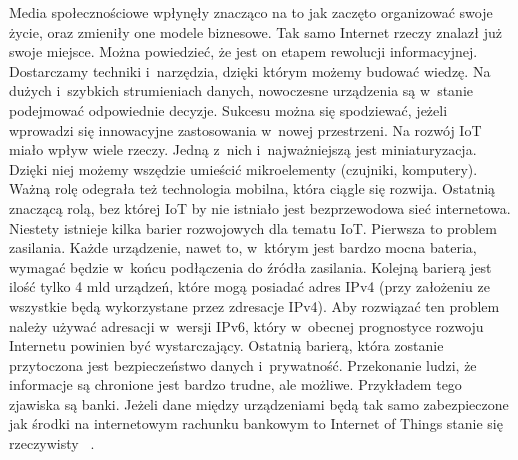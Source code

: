 \documentclass{xmgr}
\begin{document}
	Media społecznościowe wpłynęły znacząco na to jak zaczęto organizować swoje życie, oraz zmieniły one modele biznesowe. Tak samo Internet rzeczy znalazł już swoje miejsce. Można powiedzieć, że jest on etapem rewolucji informacyjnej. Dostarczamy techniki i~narzędzia, dzięki którym możemy budować wiedzę. Na dużych i~szybkich strumieniach danych, nowoczesne urządzenia są w~stanie podejmować odpowiednie decyzje. Sukcesu można się spodziewać, jeżeli wprowadzi się innowacyjne zastosowania w~nowej przestrzeni. 
	Na rozwój IoT miało wpływ wiele rzeczy. Jedną z~nich i~najważniejszą jest miniaturyzacja. Dzięki niej możemy wszędzie umieścić mikroelementy (czujniki, komputery). Ważną rolę odegrała też technologia mobilna, która ciągle się rozwija. Ostatnią znaczącą rolą, bez której IoT by nie istniało jest bezprzewodowa sieć internetowa. 
	Niestety istnieje kilka barier rozwojowych dla tematu IoT. Pierwsza to problem zasilania. Każde urządzenie, nawet to, w~którym jest bardzo mocna bateria, wymagać będzie w~końcu podłączenia do źródła zasilania. Kolejną barierą jest ilość tylko 4 mld urządzeń, które mogą posiadać adres IPv4 (przy założeniu ze wszystkie będą wykorzystane przez zdresacje IPv4). Aby rozwiązać ten problem należy używać adresacji w~wersji IPv6, który w~obecnej prognostyce rozwoju Internetu powinien być wystarczający. Ostatnią barierą, która zostanie przytoczona jest bezpieczeństwo danych i~prywatność. Przekonanie ludzi, że informacje są chronione jest bardzo trudne, ale możliwe. Przykładem tego zjawiska są banki. Jeżeli dane między urządzeniami będą tak samo zabezpieczone jak środki na internetowym rachunku bankowym to Internet of Things stanie się rzeczywisty~ \cite{KeyApplications}.
\end{document}
